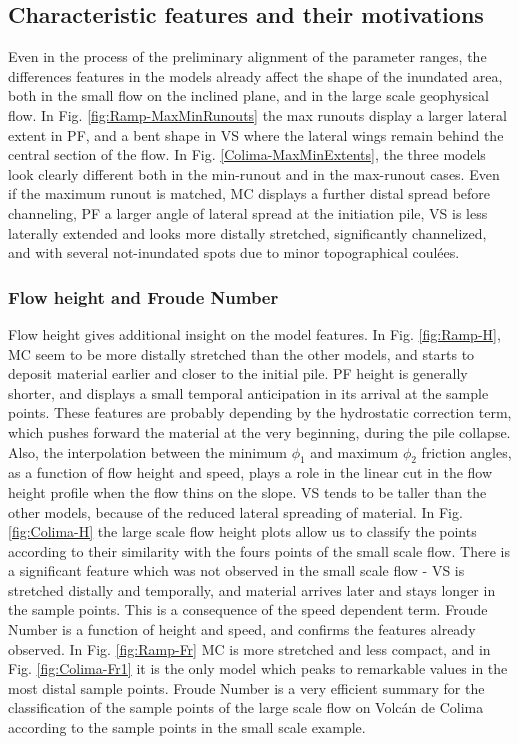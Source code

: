 \documentclass{article}
\begin{document}
\subsection{Characteristic features and their motivations}
Even in the process of the preliminary alignment of the parameter ranges, the differences features in the models already affect the shape of the inundated area, both in the small flow on the inclined plane, and in the large scale geophysical flow. In Fig. \ref{fig:Ramp-MaxMinRunouts} the max runouts display a larger lateral extent in PF, and a bent shape in VS where the lateral wings remain behind the central section of the flow. In Fig. \ref{Colima-MaxMinExtents}, the three models look clearly different both in the min-runout and in the max-runout cases. Even if the maximum runout is matched, MC displays a further distal spread before channeling, PF a larger angle of lateral spread at the initiation pile, VS is less laterally extended and looks more distally stretched, significantly channelized, and with several not-inundated spots due to minor topographical coul\'{e}es.

\subsubsection{Flow height and Froude Number}
Flow height gives additional insight on the model features. In Fig. \ref{fig:Ramp-H}, MC seem to be more distally stretched than the other models, and starts to deposit material earlier and closer to the initial pile. PF height is generally shorter, and displays a small temporal anticipation in its arrival at the sample points. These features are probably depending by the hydrostatic correction term, which pushes forward the material at the very beginning, during the pile collapse. Also, the interpolation between the minimum $\phi_1$ and maximum $\phi_2$ friction angles, as a function of flow height and speed, plays a role in the linear cut in the flow height profile when the flow thins on the slope. VS tends to be taller than the other models, because of the reduced lateral spreading of material. In Fig. \ref{fig:Colima-H} the large scale flow height plots allow us to classify the points according to their similarity with the fours points of the small scale flow. There is a significant feature which was not observed in the small scale flow - VS is stretched distally and temporally, and material arrives later and stays longer in the sample points. This is a consequence of the speed dependent term. Froude Number is a function of height and speed, and confirms the features already observed. In Fig. \ref{fig:Ramp-Fr} MC is more stretched and less compact, and in Fig. \ref{fig:Colima-Fr1} it is the only model which peaks to remarkable values in the most distal sample points. Froude Number is a very efficient summary for the classification of the sample points of the large scale flow on Volc\'{a}n de Colima according to the sample points in the small scale example.
\end{document}
